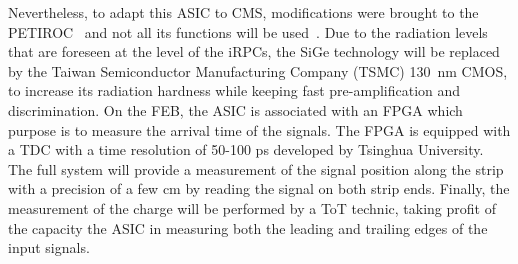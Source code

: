 	Nevertheless, to adapt this ASIC to CMS, modifications were brought to the PETIROC~\cite{PHASEIITP} and not all its functions will be used~\cite{COMBARET2018}. Due to the radiation levels that are foreseen at the level of the iRPCs, the SiGe technology will be replaced by the Taiwan Semiconductor Manufacturing Company (TSMC) \SI{130}{nm} CMOS, to increase its radiation hardness while keeping fast pre-amplification and discrimination. On the \acl{FEB}, the ASIC is associated with an FPGA which purpose is to measure the arrival time of the signals. The FPGA is equipped with a TDC with a time resolution of 50-100 \si{ps} developed by Tsinghua University. The full system will provide a measurement of the signal position along the strip with a precision of a few \si{cm} by reading the signal on both strip ends. Finally, the measurement of the charge will be performed by a \acf{ToT} technic, taking profit of the capacity the ASIC in measuring both the leading and trailing edges of the input signals.
	
	\newpage

